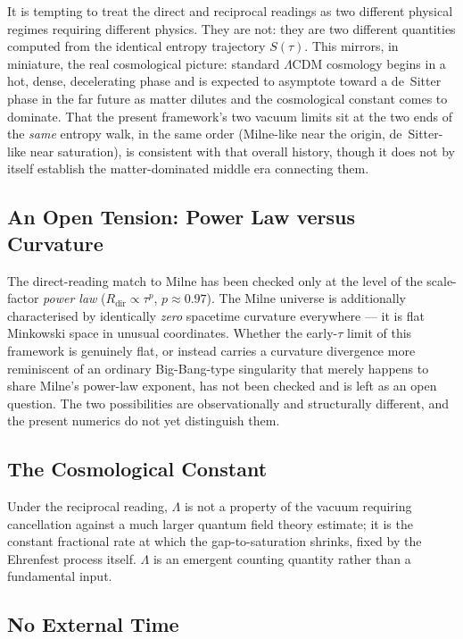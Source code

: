 \documentclass[11pt]{article}
\begin{document}
It is tempting to treat the direct and reciprocal readings as two
different physical regimes requiring different physics. They are not:
they are two different quantities computed from the identical entropy
trajectory $S(\tau)$. This mirrors, in miniature, the real cosmological
picture: standard $\Lambda$CDM cosmology begins in a hot, dense,
decelerating phase and is expected to asymptote toward a de~Sitter phase
in the far future as matter dilutes and the cosmological constant comes
to dominate. That the present framework's two vacuum limits sit at the
two ends of the \emph{same} entropy walk, in the same order (Milne-like
near the origin, de~Sitter-like near saturation), is consistent with
that overall history, though it does not by itself establish the
matter-dominated middle era connecting them.


\subsection{An Open Tension: Power Law versus Curvature}

The direct-reading match to Milne has been checked only at the level of
the scale-factor \emph{power law} ($R_{\text{dir}}\propto\tau^{p}$,
$p\approx0.97$). The Milne universe is additionally characterised by
identically \emph{zero} spacetime curvature everywhere --- it is flat
Minkowski space in unusual coordinates. Whether the early-$\tau$ limit
of this framework is genuinely flat, or instead carries a curvature
divergence more reminiscent of an ordinary Big-Bang-type singularity
that merely happens to share Milne's power-law exponent, has not been
checked and is left as an open question. The two possibilities are
observationally and structurally different, and the present numerics do
not yet distinguish them.

\subsection{The Cosmological Constant}

Under the reciprocal reading, $\Lambda$ is not a property of the vacuum
requiring cancellation against a much larger quantum field theory
estimate; it is the constant fractional rate at which the
gap-to-saturation shrinks, fixed by the Ehrenfest process itself. $\Lambda$ is an emergent
counting quantity rather than a fundamental input.

\subsection{No External Time}
\end{document}
